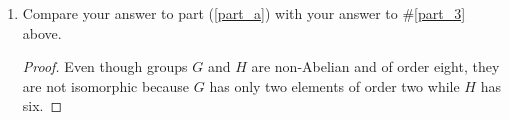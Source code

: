 \documentclass{article}
\begin{document}
\begin{enumerate}
\begin{enumerate}
\begin{proof}
\begin{center}
\begin{tabular}{|r||r|r|r|r|r|r|r|r|}
              $-A$      & $I$   & $-I$  & $-AB$ & $AB$  & $B$   & $-B$  & $-A$  & $A$ \\
              \hline
              $B$       & $-AB$ & $AB$  & $I$   & $-I$  & $-A$  & $A$   & $B$   & $-B$ \\
              \hline
              $-B$      & $AB$  & $-AB$ & $-I$  & $I$   & $A$   & $-A$  & $-B$  & $B$ \\
              \hline
              $AB$      & $B$   & $-B$  & $A$   & $-A$  & $I$   & $-I$  & $AB$  & $-AB$ \\
              \hline
              $-AB$     & $-B$  & $B$   & $-A$  & $A$   & $-I$  & $I$   & $-AB$ & $AB$ \\
              \hline
              $I$       & $A$   & $-A$  & $B$   & $-B$  & $AB$  & $-AB$ & $I$   & $-I$ \\
              \hline
              $-I$      & $-A$  & $A$   & $-B$  & $B$   & $-AB$ & $AB$  & $-I$  & $I$ \\
              \hline
            \end{tabular}
          \end{center}
        \end{proof}
      \item Compare your answer to part (\ref{part_a}) with your answer to
        \#\ref{part_3} above.
        \begin{proof}
          Even though groups $G$ and $H$ are non-Abelian and of order eight,
          they are not isomorphic because $G$ has only two elements of
          order two while $H$ has six.
        \end{proof}
    \end{enumerate}


\end{enumerate}
\end{document}
